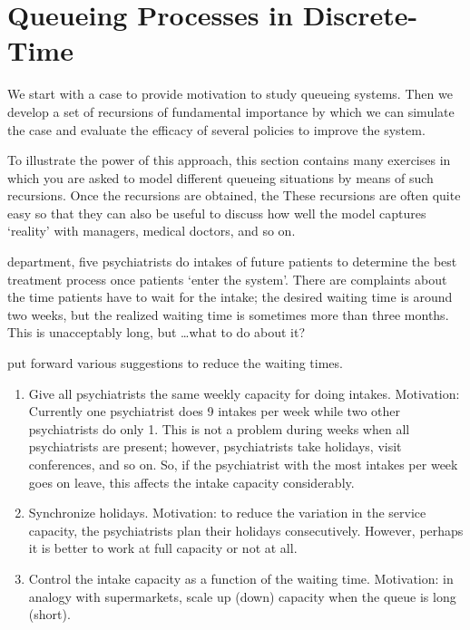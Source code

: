 


\section{Queueing Processes in Discrete-Time}
\label{sec:constr-discr-time}


We start with a case to provide motivation to study queueing systems.
Then we develop a set of recursions of fundamental importance by which we can simulate the case and evaluate the efficacy of several policies to improve the system.

To illustrate the power of this approach, this section contains many  exercises in which you are asked to model different queueing situations by means of such recursions. Once the recursions are obtained, the  
These recursions are often quite easy so that they can also be useful to discuss how well the model captures `reality' with managers, medical doctors, and so on.


 department, five psychiatrists do intakes of future patients to determine the best treatment process once patients `enter the system'.
There are complaints about the time patients have to wait for the intake; the desired waiting time is around two weeks, but the realized waiting time is sometimes more than three months.
This is  unacceptably long, but \ldots what to do about it?

  put forward various suggestions to reduce the waiting times.
\begin{enumerate}
\item Give all psychiatrists the same weekly capacity for doing intakes.
  Motivation: Currently one psychiatrist does 9 intakes per week while two other psychiatrists do only 1.
  This is not a problem during weeks when all psychiatrists are present; however, psychiatrists take holidays, visit conferences, and so on.
  So, if the psychiatrist with the most intakes per week goes on leave, this affects the intake capacity considerably.
\item Synchronize holidays.
  Motivation: to reduce the variation in the service capacity, the psychiatrists plan their holidays consecutively.
  However, perhaps it is better to work at full capacity or not at all.
\item Control  the intake capacity as a function of the waiting time.
 Motivation: in analogy with supermarkets,  scale up (down) capacity when the queue is long (short). 
\end{enumerate}



